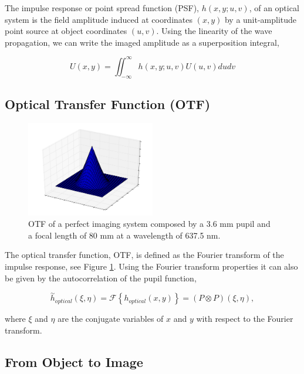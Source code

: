 The impulse response or point spread function (PSF), $h(x,y;u,v)$, of an optical system is  the field amplitude induced at coordinates $(x,y)$ by a unit-amplitude point source at object coordinates $(u,v)$. Using the linearity of the wave propagation, we can write the imaged amplitude as a superposition integral,

\begin{equation}
U(x,y) = \iint_{-\infty}^{\infty} h(x,y;u,v)U(u,v)dudv
\label{eqt:superpositionIntegral}
\end{equation}

\subsection{Optical Transfer Function (OTF)}
\label{subsec:OTF}

\begin{figure}
\begin{center}
\includegraphics[width=0.5\textwidth,angle=0]{Figures/OTF}
\decoRule
\caption{OTF of a perfect imaging system composed by a 3.6 mm pupil and a focal length of 80 mm at a wavelength of 637.5 nm.}
\label{fig:OTF}
\end{center}
\end{figure}

The optical transfer function, OTF, is defined as the Fourier transform of the impulse response, see Figure \ref{fig:OTF}. Using the Fourier transform properties it can also be given by the autocorrelation of the pupil function,

\begin{equation}
\overset{\sim}{h}_{optical}(\xi,\eta) = \mathcal{F}\left\lbrace h_{optical}(x,y)\right\rbrace = (P \otimes P)(\xi,\eta),
\label{eqt:OTF}
\end{equation}

where $\xi$ and $\eta$ are the conjugate variables of $x$ and $y$ with respect to the Fourier transform.

\subsection{From Object to Image}
\label{subsec:FromOtoI}

